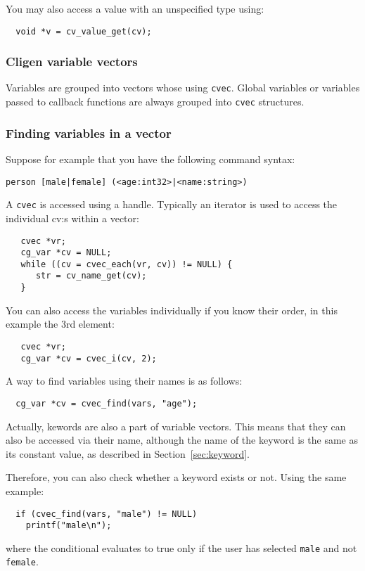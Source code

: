 \documentclass[a4paper, 10pt] {article}
\begin{document}
You may also access a value with an unspecified type using:
\begin{verbatim}
  void *v = cv_value_get(cv);
\end{verbatim}


\subsubsection{Cligen variable vectors}
Variables are grouped into vectors whose using {\tt cvec}. Global variables or variables
passed to callback functions are always grouped into {\tt cvec}
structures.

\subsubsection{Finding variables in a vector}
\label{sec:find}

Suppose for example that you have the following command syntax:
\begin{verbatim}
person [male|female] (<age:int32>|<name:string>)
\end{verbatim}

A {\tt cvec} is accessed using a handle. Typically an iterator is used to access the individual cv:s within a vector:
\begin{verbatim}
   cvec *vr;
   cg_var *cv = NULL;
   while ((cv = cvec_each(vr, cv)) != NULL) {
      str = cv_name_get(cv);
   }
\end{verbatim}

You can also access the variables individually if you know their order, in this example the 3rd element:
\begin{verbatim}
   cvec *vr;
   cg_var *cv = cvec_i(cv, 2);
\end{verbatim}

A way to find variables using their names is as follows:
\begin{verbatim}
  cg_var *cv = cvec_find(vars, "age");
\end{verbatim}

Actually, kewords are also a part of variable vectors. This means that
they can also be accessed via their name, although the name of the
keyword is the same as its constant value, as described in
Section~\ref{sec:keyword}.

Therefore, you can also check whether a keyword exists or not. Using the same example:
\begin{verbatim}
  if (cvec_find(vars, "male") != NULL)
    printf("male\n");
\end{verbatim}
where the conditional evaluates to true only if the user has selected
{\tt male} and not {\tt female}.
\end{document}
